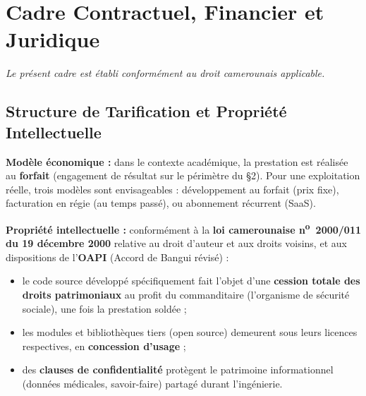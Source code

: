 \documentclass[11pt,a4paper]{article}
\begin{document}
\section{Cadre Contractuel, Financier et Juridique}

\emph{Le présent cadre est établi conformément au droit camerounais applicable.}

\subsection{Structure de Tarification et Propriété Intellectuelle}
\textbf{Modèle économique :} dans le contexte académique, la prestation est réalisée
au \textbf{forfait} (engagement de résultat sur le périmètre du §2). Pour une
exploitation réelle, trois modèles sont envisageables : développement au forfait
(prix fixe), facturation en régie (au temps passé), ou abonnement récurrent (SaaS).

\textbf{Propriété intellectuelle :} conformément à la \textbf{loi camerounaise
n\textsuperscript{o}~2000/011 du 19 décembre 2000} relative au droit d'auteur et aux
droits voisins, et aux dispositions de l'\textbf{OAPI} (Accord de Bangui révisé) :
\begin{itemize}[leftmargin=1.4em]
  \item le code source développé spécifiquement fait l'objet d'une \textbf{cession
  totale des droits patrimoniaux} au profit du commanditaire (l'organisme de sécurité
  sociale), une fois la prestation soldée ;
  \item les modules et bibliothèques tiers (open source) demeurent sous leurs licences
  respectives, en \textbf{concession d'usage} ;
  \item des \textbf{clauses de confidentialité} protègent le patrimoine informationnel
  (données médicales, savoir-faire) partagé durant l'ingénierie.
\end{itemize}
\end{document}
